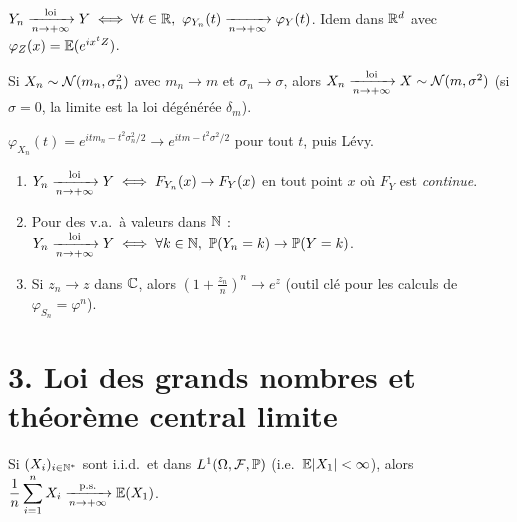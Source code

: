 \documentclass[11pt,a4paper]{article}
\begin{document}
\begin{theoreme}\label{C4:levy}
$Y_n\tendloi Y\iff\forall t\in\R,\ \varphi_{Y_n}(t)\xrightarrow[n\to+\infty]{}\varphi_Y(t)$. Idem dans $\mathbb{R}^d$ avec $\varphi_Z(x)=\mathbb{E}(e^{ix^tZ})$.
\end{theoreme}

\begin{lemme}\label{C4:lim-gauss}
Si $X_n\sim\mathcal{N}(m_n,\sigma_n^2)$ avec $m_n\to m$ et $\sigma_n\to\sigma$, alors $X_n\xrightarrow[n\to+\infty]{\text{loi}} X\sim\mathcal{N}(m,\sigma^2)$
(si $\sigma=0$, la limite est la loi dégénérée $\delta_m$).
\end{lemme}
\begin{idee}
$\varphi_{X_n}(t)=e^{itm_n-t^2\sigma_n^2/2}\to e^{itm-t^2\sigma^2/2}$ pour tout $t$, puis Lévy.
\end{idee}

\begin{horscours}\label{C4:criteres}\leavevmode
\begin{enumerate}
  \item $Y_n\xrightarrow[n\to+\infty]{\text{loi}} Y\iff F_{Y_n}(x)\to F_Y(x)$ en tout point $x$ où $F_Y$ est \emph{continue}.
  \item Pour des v.a.\ à valeurs dans $\mathbb{N}$ : $Y_n\xrightarrow[n\to+\infty]{\text{loi}} Y\iff\forall k\in\mathbb{N},\ \mathbb{P}(Y_n=k)\to\mathbb{P}(Y=k)$.
  \item Si $z_n\to z$ dans $\mathbb{C}$, alors $(1+\frac{z_n}{n})^n\to e^z$ (outil clé pour les calculs de $\varphi_{S_n}=\varphi^n$).
\end{enumerate}
\end{horscours}

\section*{3. Loi des grands nombres et théorème central limite}

\begin{theoreme}\label{C4:LGN}
Si $(X_i)_{i\in\mathbb{N}^*}$ sont i.i.d.\ et dans $L^1(\Omega,\mathcal{F},\mathbb{P})$ (i.e.\ $\mathbb{E}|X_1|<\infty$), alors
$\displaystyle\frac1n\sum_{i=1}^nX_i\xrightarrow[n\to+\infty]{\text{p.s.}}\mathbb{E}(X_1)$.
\end{theoreme}
\end{document}
